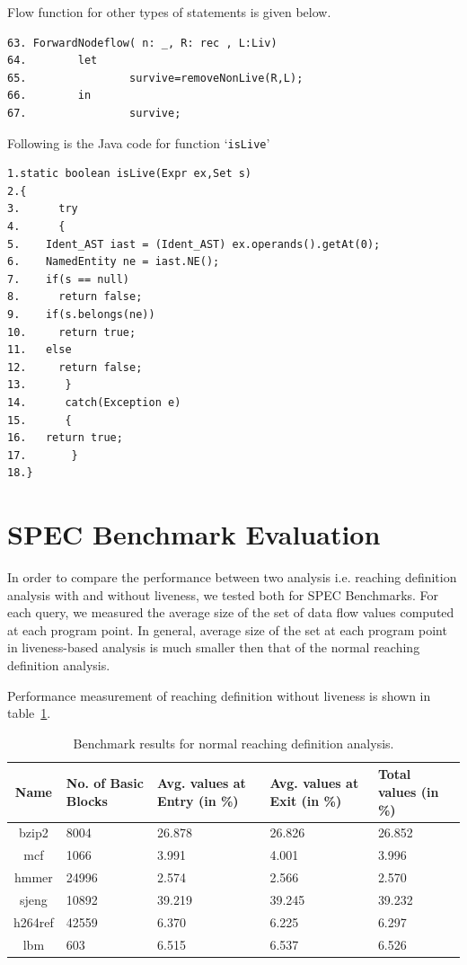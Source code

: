 \documentclass[11pt,a4paper,openright]{report}
\begin{document}
Flow function for other types of statements is given below.

\begin{lstlisting}
63. ForwardNodeflow( n: _, R: rec , L:Liv)
64.        let
65.                survive=removeNonLive(R,L);
66.        in
67.                survive;

\end{lstlisting}

Following is the Java code for function `\texttt{isLive}' 
\begin{lstlisting}
1.static boolean isLive(Expr ex,Set s)
2.{
3.      try
4.      {
5.	  Ident_AST iast = (Ident_AST) ex.operands().getAt(0);
6.	  NamedEntity ne = iast.NE();
7.	  if(s == null)
8.		return false;
9.	  if(s.belongs(ne))
10.		return true;
11.	  else
12.		return false;
13.      }
14.      catch(Exception e)
15.      {
16.	  return true;
17.       }
18.}
\end{lstlisting}


\section{SPEC Benchmark Evaluation}
In order to compare the performance between two analysis i.e. reaching definition analysis with and without liveness, we tested both for SPEC Benchmarks.
For each query, we measured the average size of the set of data flow values computed at each program point. In general, average size of the set at each
program point in liveness-based analysis is much smaller then that of the normal reaching definition analysis.

Performance measurement of reaching definition without liveness is shown in table~\ref{tab:performance_without_l}.
\begin{table}[H]
  \begin{center}
    \begin{tabular}{|c|p{1.5cm}|p{2cm}|p{2cm}|p{2cm}|}
    \hline
      Name & No. of Basic Blocks & Avg. values at Entry (in \%) & Avg. values at Exit (in \%) & Total values (in \%)\\
      \hline
   	  bzip2 & 8004 & 26.878 & 26.826 & 26.852 \\ \hline
   	  mcf & 1066 & 3.991 & 4.001 & 3.996 \\ \hline
   	  hmmer & 24996 & 2.574 & 2.566  & 2.570 \\ \hline
   	  sjeng & 10892 & 39.219 & 39.245 & 39.232 \\ \hline
   	  h264ref & 42559 & 6.370 & 6.225 & 6.297\\ \hline
   	  lbm & 603 & 6.515 & 6.537 & 6.526\\ \hline
   	  
	\hline
    \end{tabular}
    \caption{Benchmark results for normal reaching definition analysis.}
      \label{tab:performance_without_l}
  \end{center}
\end{table}
\end{document}
